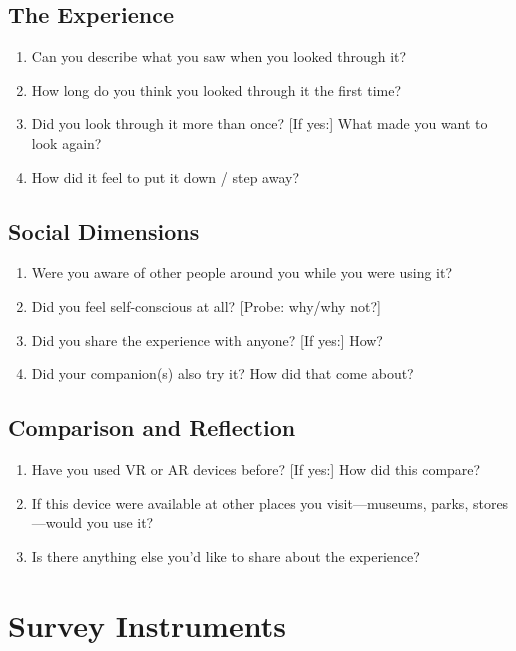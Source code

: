 \subsection{The Experience}
\begin{enumerate}[resume]
    \item Can you describe what you saw when you looked through it?
    \item How long do you think you looked through it the first time?
    \item Did you look through it more than once? [If yes:] What made you want to look again?
    \item How did it feel to put it down / step away?
\end{enumerate}

\subsection{Social Dimensions}
\begin{enumerate}[resume]
    \item Were you aware of other people around you while you were using it?
    \item Did you feel self-conscious at all? [Probe: why/why not?]
    \item Did you share the experience with anyone? [If yes:] How?
    \item [If in group:] Did your companion(s) also try it? How did that come about?
\end{enumerate}

\subsection{Comparison and Reflection}
\begin{enumerate}[resume]
    \item Have you used VR or AR devices before? [If yes:] How did this compare?
    \item If this device were available at other places you visit---museums, parks, stores---would you use it?
    \item Is there anything else you'd like to share about the experience?
\end{enumerate}


\section{Survey Instruments}
\label{appendix:survey}

